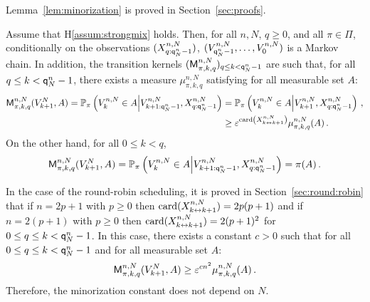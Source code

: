 Lemma~\ref{lem:minorization} is proved in Section~\ref{sec:proofs}.
\begin{lemma}
\label{lem:minorization}
Assume that H\ref{assum:strongmix} holds. Then, for all $n,N$, $q\ge 0$, and all $\pi\in\Pi$, conditionally on the observations $(X_{q:{\mathsf{q}}^{n}_{N}-1}^{n,N})$, $(V_{{\mathsf{q}}^{n}_{N}-1}^{n,N},\ldots,V_0^{n,N})$ is a Markov chain. In addition,  the transition kernels $(\mathsf{M}^{n,N}_{\pi,k,q})_{q\le k <{\mathsf{q}}^{n}_{N}-1}$ are such that, for all $q\le k < {\mathsf{q}}^{n}_{N}-1$, there exists a measure $\mu^{n,N}_{\pi,k,q}$ satisfying for all measurable set $A$:
\begin{align*}
\mathsf{M}^{n,N}_{\pi,k,q}(V^N_{k+1},A) = \mathbb{P}_{\pi}\left(V^{n,N}_{k}\in A\middle|V^{n,N}_{k+1:{\mathsf{q}}^{n}_{N}-1},X_{q:{\mathsf{q}}^{n}_{N}-1}^{n,N}\right)  &= \mathbb{P}_{\pi}\left(V^{n,N}_{k}\in A\middle|V^{n,N}_{k+1},X_{q:{\mathsf{q}}^{n}_{N}-1}^{n,N}\right)\,,\\
&\ge \varepsilon^{\mathrm{card}\left(X^{n,N}_{k\leftrightarrow k+1}\right)} \mu^{n,N}_{\pi,k,q}(A)\,.
\end{align*}
On the other hand, for all $0\le k <q$,
\[
\mathsf{M}^{n,N}_{\pi,k,q}(V^N_{k+1},A) = \mathbb{P}_{\pi}\left(V^{n,N}_{k}\in A\middle|V^{n,N}_{k+1:{\mathsf{q}}^{n}_{N}-1},X_{q:{\mathsf{q}}^{n}_{N}-1}^{n,N}\right) = \pi(A)\,.
\]
\end{lemma}
\begin{remark}
\label{rem:forgetting:robin}
In the case of the round-robin scheduling, it is proved in Section~\ref{sec:round:robin} that if  $n = 2p+1$ with $p\ge 0$ then $\mathrm{card}(X^{n,N}_{k\leftrightarrow k+1}) = 2p(p+1)$ and  if  $n = 2(p+1)$ with $p\ge 0$ then $\mathrm{card}(X^{n,N}_{k\leftrightarrow k+1}) = 2(p+1)^2$ for  $0 \le q\le  k <{\mathsf{q}}^{n}_{N}-1$. In this case, there exists a constant $c>0$ such that  for all $0\le q\le k < {\mathsf{q}}^{n}_{N}-1$ and for all measurable set $A$:
\[
\mathsf{M}^{n,N}_{\pi,k,q}(V^N_{k+1},A)  \ge \varepsilon^{cn^2} \mu^{n,N}_{\pi,k,q}(A)\,.
\]
Therefore, the minorization constant does not depend on $N$.
\end{remark}
